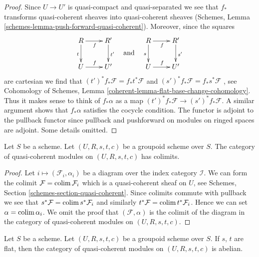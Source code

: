 \begin{proof}
Since $U \to U'$ is quasi-compact and quasi-separated we see that
$f_*$ transforms quasi-coherent sheaves into quasi-coherent sheaves
(Schemes, Lemma \ref{schemes-lemma-push-forward-quasi-coherent}).
Moreover, since the squares
$$
\vcenter{
\xymatrix{
R \ar[d]_t \ar[r]_f & R' \ar[d]^{t'} \\
U \ar[r]^f & U'
}
}
\quad\text{and}\quad
\vcenter{
\xymatrix{
R \ar[d]_s \ar[r]_f & R' \ar[d]^{s'} \\
U \ar[r]^f & U'
}
}
$$
are cartesian we find that $(t')^*f_*\mathcal{F} = f_*t^*\mathcal{F}$
and $(s')^*f_*\mathcal{F} = f_*s^*\mathcal{F}$ , see
Cohomology of Schemes, Lemma
\ref{coherent-lemma-flat-base-change-cohomology}.
Thus it makes sense to think of $f_*\alpha$ as a map
$(t')^*f_*\mathcal{F} \to (s')^*f_*\mathcal{F}$. A similar argument
shows that $f_*\alpha$ satisfies the cocycle condition.
The functor is adjoint to the pullback functor since pullback
and pushforward on modules on ringed spaces are adjoint.
Some details omitted.
\end{proof}

\begin{lemma}
\label{lemma-colimits}
Let $S$ be a scheme. Let $(U, R, s, t, c)$ be a groupoid scheme over $S$.
The category of quasi-coherent modules on $(U, R, s, t, c)$ has colimits.
\end{lemma}

\begin{proof}
Let $i \mapsto (\mathcal{F}_i, \alpha_i)$ be a diagram over the index
category $\mathcal{I}$. We can form the colimit
$\mathcal{F} = \mathop{\mathrm{colim}}\nolimits \mathcal{F}_i$
which is a quasi-coherent sheaf on $U$, see
Schemes, Section \ref{schemes-section-quasi-coherent}.
Since colimits commute with pullback we see that
$s^*\mathcal{F} = \mathop{\mathrm{colim}}\nolimits s^*\mathcal{F}_i$ and similarly
$t^*\mathcal{F} = \mathop{\mathrm{colim}}\nolimits t^*\mathcal{F}_i$. Hence we can set
$\alpha = \mathop{\mathrm{colim}}\nolimits \alpha_i$. We omit the proof that $(\mathcal{F}, \alpha)$
is the colimit of the diagram in the category of quasi-coherent modules
on $(U, R, s, t, c)$.
\end{proof}

\begin{lemma}
\label{lemma-abelian}
Let $S$ be a scheme.
Let $(U, R, s, t, c)$ be a groupoid scheme over $S$.
If $s$, $t$ are flat, then the category of quasi-coherent modules on
$(U, R, s, t, c)$ is abelian.
\end{lemma}


